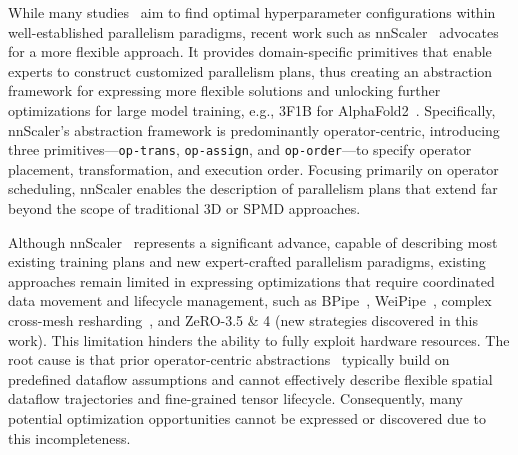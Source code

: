 \documentclass[letterpaper,twocolumn,10pt]{article}
\begin{document}
While many studies~\cite{tarnawski2021piper, zheng2022alpa, um2024metis, ge2024enabling, sun2024adapipe, isaev2023calculon, strati2025sailor, zhu2025mist, wang2019supporting} aim to find optimal hyperparameter configurations within well-established parallelism paradigms, recent work such as nnScaler~\cite{lin2024nnscaler} advocates for a more flexible approach. It provides domain-specific primitives that enable experts to construct customized parallelism plans, thus creating an abstraction framework for expressing more flexible solutions and unlocking further optimizations for large model training, e.g., 3F1B for AlphaFold2~\cite{Jumper2021}. Specifically, nnScaler's abstraction framework is predominantly operator-centric, introducing three primitives—\texttt{op-trans}, \texttt{op-assign}, and \texttt{op-order}—to specify operator placement, transformation, and execution order. Focusing primarily on operator scheduling, nnScaler enables the description of parallelism plans that extend far beyond the scope of traditional 3D or SPMD approaches.



Although nnScaler~\cite{lin2024nnscaler} represents a significant advance, capable of describing most existing training plans and new expert-crafted parallelism paradigms, existing approaches remain limited in expressing optimizations that require coordinated data movement and lifecycle management, such as BPipe~\cite{kim2023bpipe}, WeiPipe~\cite{lin2025weipipe}, complex cross-mesh resharding~\cite{zhuang2023optimizing}, and ZeRO-3.5 \& 4 (new strategies discovered in this work). This limitation hinders the ability to fully exploit hardware resources. The root cause is that prior operator-centric abstractions~\cite{lin2024nnscaler, lin2024tessel, zheng2022alpa} typically build on predefined dataflow assumptions and cannot effectively describe flexible spatial dataflow trajectories and fine-grained tensor lifecycle. Consequently, many potential optimization opportunities cannot be expressed or discovered due to this incompleteness.
\end{document}
